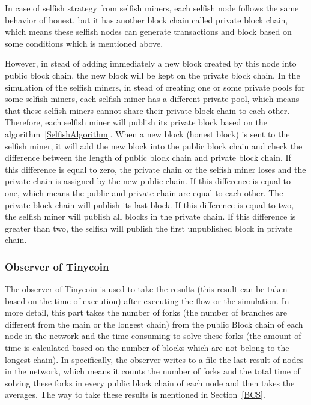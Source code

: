 \documentclass[runningheads,a4paper]{llncs}
\begin{document}
In case of selfish strategy from selfish miners, each selfish node follows the same behavior of honest, but it has another block chain called private block chain, which means these selfish nodes can generate transactions and block based on some conditions which is mentioned above.

However, in stead of adding immediately a new block created by this node into public block chain, the new block will be kept on the private block chain. 
In the simulation of the selfish miners, in stead of creating one or some private pools for some selfish miners, each selfish miner has a different private pool, which means that these selfish miners cannot share their private block chain to each other. 
Therefore, each selfish miner will publish its private block based on the algorithm~\ref{SelfishAlgorithm}.
When a new block (honest block) is sent to the selfish miner, it will add the new block into the public block chain and check the difference between the length of public block chain and private block chain.
If this difference is equal to zero, the private chain or the selfish miner loses and the private chain is assigned by the new public chain. If this difference is equal to one, which means the public and private chain are equal to each other. The private block chain will publish its last block. 
If this difference is equal to two, the selfish miner will publish all blocks in the private chain.
If this difference is greater than two, the selfish will publish the first unpublished block in private chain.

\subsubsection{Observer of Tinycoin}
The observer of Tinycoin is used to take the results (this result can be taken based on the time of execution) after executing the flow or the simulation. 
In more detail, this part takes the number of forks (the number of branches are different from the main or the longest chain) from the public Block chain of each node in the network and the time consuming to solve these forks (the amount of time is calculated based on the number of blocks which are not belong to the longest chain).
In specifically, the observer writes to a file the last result of nodes in the network, which means it counts the number of forks and the total time of solving these forks in every public block chain of each node and then takes the averages.
The way to take these results is mentioned in Section~\ref{BCS}.
\end{document}
